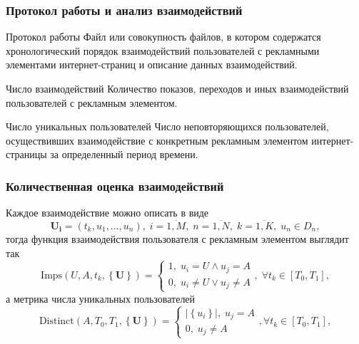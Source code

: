\documentclass[handout]{beamer}
\begin{document}
\begin{frame}
    \frametitle{Протокол работы и анализ взаимодействий}
    \begin{block}{Протокол работы}
    Файл или совокупность файлов, в котором содержатся хронологический порядок
    взаимодействий пользователей с рекламными элементами интернет-страниц и описание данных взаимодействий.
    \end{block}
    \begin{block}{Число взаимодействий}
        Количество показов, переходов и иных взаимодействий пользователей с рекламным элементом.
        \end{block}
        \begin{block}{Число уникальных пользователей}
            Число неповторяющихся пользователей, осуществивших взаимодействие с конкретным рекламным элементом интернет-страницы за определенный период времени.
        \end{block}
\end{frame}

\begin{frame}
    \frametitle{Количественная оценка взаимодействий}
    Каждое взаимодействие можно описать в виде
    \begin{equation*}
        \mathbf{U_i} = \left(t_k, u_1, \dots, u_n \right),
        \; i = \overline{1, M},
        \; n = \overline{1, N},
        \; k = \overline{1, K},
        \; u_n \in D_n,
    \end{equation*}
    тогда функция взаимодействия пользователя с рекламным элементом выглядит так
    \begin{equation*}
        \text{Imps} \left( U, A, t_k, \left\{ \mathbf{U} \right\} \right) =
            \begin{cases}
                1,\; u_i = U \wedge u_j = A  \\
                0,\; u_i \neq U \vee u_j \neq A
            \end{cases},
            \; \forall t_k \in \left[ T_0, T_1 \right],
        \label{eq:user-imps-definition}
    \end{equation*}
    а метрика числа уникальных пользователей
    \begin{equation*}
        \text{Distinct}\left( A, T_0, T_1, \left\{\mathbf{U}\right\} \right) =
        \begin{cases}
            \left|\left\{u_i\right\}\right|,\; u_j = A  \\
            0,\; u_j \neq A
        \end{cases}, \forall t_k \in \left[T_0, T_1\right],
    \end{equation*}
\end{frame}
\end{document}
